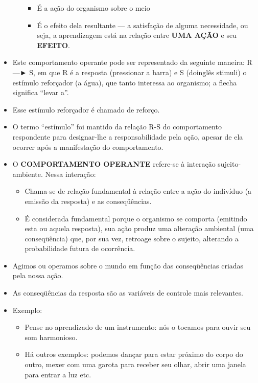 \documentclass[
]{book}
\providecommand{\tightlist}{%
  \setlength{\itemsep}{0pt}\setlength{\parskip}{0pt}}
\begin{document}
\begin{itemize}
\begin{itemize}
    \begin{itemize}
    \tightlist
    \item
      É a ação do organismo sobre o meio
    \item
      É o efeito dela resultante --- a satisfação de alguma necessidade, ou seja, a aprendizagem está na relação entre \textbf{UMA AÇÃO} e seu \textbf{EFEITO}.
    \end{itemize}
  \end{itemize}
\item
  Este comportamento operante pode ser representado da seguinte maneira: R ---► S, em que R é a resposta (pressionar a barra) e S (doinglês stimuli) o estímulo reforçador (a água), que tanto interessa ao organismo; a flecha significa ``levar a''.
\item
  Esse estímulo reforçador é chamado de reforço.
\item
  O termo ``estímulo'' foi mantido da relação R-S do comportamento respondente para designar-lhe a responsabilidade pela ação, apesar de ela ocorrer após a manifestação do comportamento.
\item
  O \textbf{COMPORTAMENTO OPERANTE} refere-se à interação sujeito-ambiente. Nessa interação:

  \begin{itemize}
  \tightlist
  \item
    Chama-se de relação fundamental à relação entre a ação do indivíduo (a emissão da resposta) e as conseqüências.
  \item
    É considerada fundamental porque o organismo se comporta (emitindo esta ou aquela resposta), sua ação produz uma alteração ambiental (uma conseqüência) que, por sua vez, retroage sobre o sujeito, alterando a probabilidade futura de ocorrência.
  \end{itemize}
\item
  Agimos ou operamos sobre o mundo em função das conseqüências criadas pela nossa ação.
\item
  As conseqüências da resposta são as variáveis de controle mais relevantes.
\item
  Exemplo:

  \begin{itemize}
  \tightlist
  \item
    Pense no aprendizado de um instrumento: nós o tocamos para ouvir seu som harmonioso.
  \item
    Há outros exemplos: podemos dançar para estar próximo do corpo do outro, mexer com uma garota para receber seu olhar, abrir uma janela para entrar a luz etc.
  \end{itemize}
\end{itemize}
\end{document}
